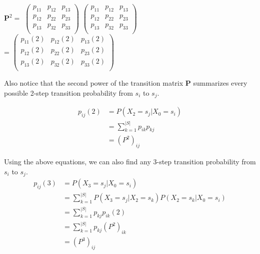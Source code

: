 \documentclass[a4paper, 12pt]{article}
\begin{document}
        \begin{center}
        $\textbf{P}^2 =$
           $\begin{pmatrix}
                p_{11} & p_{12} & p_{13} \\
                p_{12} & p_{22} & p_{23} \\
                p_{13} & p_{32} & p_{33} \\
            \end{pmatrix}$
            $\begin{pmatrix}
                p_{11} & p_{12} & p_{13} \\
                p_{12} & p_{22} & p_{23} \\
                p_{13} & p_{32} & p_{33} \\
            \end{pmatrix}$
            \\[0.4cm]
            = $\begin{pmatrix}
                p_{11}(2) & p_{12}(2) & p_{13}(2) \\
                p_{12}(2) & p_{22}(2) & p_{23}(2) \\
                p_{13}(2) & p_{32}(2) & p_{33}(2) \\
            \end{pmatrix}$
        \end{center}
        
        Also notice that the second power of the transition matrix \textbf{P} summarizes every possible 2-step transition probability from \emph{$s_i$} to \emph{$s_j$}.

	\begin{equation}
	\begin{aligned}
		p_{ij}(2) &= P(X_2 = s_j|X_0 = s_i) \\ 
				  &= \sum_{k=1}^{|S|} p_{ik}p_{kj}\\
				  &= (P^2)_{ij}
	\end{aligned}
	\end{equation}	    
  
Using the above equations, we can also find any 3-step transition probability from \emph{$s_i$} to \emph{$s_j$}.
	\begin{equation*}
	\begin{aligned}
		p_{ij}(3) &= P(X_3 = s_j|X_0 = s_i) \\
				  &= \sum_{k=1}^{|S|} P(X_3 = s_j|X_2 = s_k)P(X_2 = s_k | X_0 = s_i) \\
				  &= \sum_{k=1}^{|S|} p_{kj}p_{ik}(2) \\
				  &= \sum_{k=1}^{|S|} p_{kj}(P^2)_{ik} \\
				  &= (P^3)_{ij}
	\end{aligned}
	\end{equation*}\\
\end{document}
